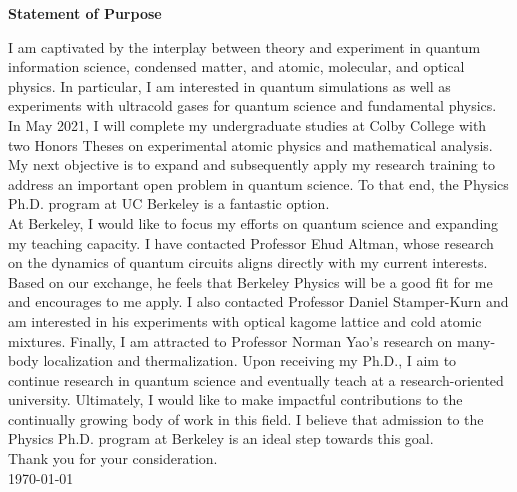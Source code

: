 \documentclass[12pt]{article}
\begin{document}
\begin{center}
	\textbf{Statement of Purpose}
\end{center}
I am captivated by the interplay between theory and experiment in quantum information science, condensed matter, and atomic, molecular, and optical physics. In particular, I am interested in  quantum simulations as well as experiments with ultracold gases for quantum science and fundamental physics. In May 2021, I will complete my undergraduate studies at Colby College with two Honors Theses on experimental atomic physics and mathematical analysis. My next objective is to expand and subsequently apply my research training to address an important open problem in quantum science. To that end, the Physics Ph.D. program at UC Berkeley is a fantastic option.  \\ 
	

	
At Berkeley, I would like to focus my efforts on quantum science and expanding my teaching capacity. I have contacted Professor Ehud Altman, whose research on the dynamics of quantum circuits aligns directly with my current interests. Based on our exchange, he feels that Berkeley Physics will be a good fit for me and encourages to me apply. I also contacted Professor Daniel Stamper-Kurn and am interested in his experiments with optical kagome lattice and cold atomic mixtures. Finally, I am attracted to Professor Norman Yao's research on many-body localization and thermalization. Upon receiving my Ph.D., I aim to continue research in quantum science and eventually teach at a research-oriented university. Ultimately, I would like to make impactful contributions to the continually growing body of work in this field. I believe that admission to the Physics Ph.D. program at Berkeley is an ideal step towards this goal. \\
	
	
\noindent Thank you for your consideration. \\
	
\noindent \today














	
	
	
	
	
\end{document}
